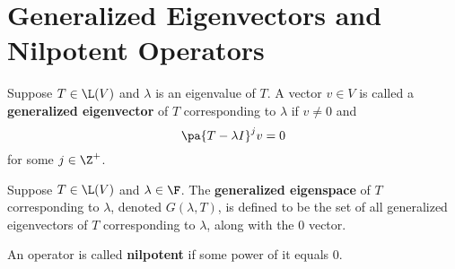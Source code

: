 \section{Generalized Eigenvectors and Nilpotent Operators}

\begin{definition}
  Suppose $T \in \L(V)$ and $\lambda$ is an eigenvalue of $T$. A vector $v \in V$ is called a \textbf{generalized eigenvector} of $T$ corresponding to $\lambda$ if $v \neq 0$ and
  \begin{equation}
    \pa{
      T - \lambda I
    }^jv = 0
  \end{equation}
  for some $j \in \Z^+$.
\end{definition}

\begin{definition}
  Suppose $T \in \L(V)$ and $\lambda \in \F$. The \textbf{generalized eigenspace} of $T$ corresponding to $\lambda$, denoted $G(\lambda, T)$, is defined to be the set of all generalized eigenvectors of $T$ corresponding to $\lambda$, along with the 0 vector.
\end{definition}

\begin{definition}
  An operator is called \textbf{nilpotent} if some power of it equals 0.
\end{definition}



